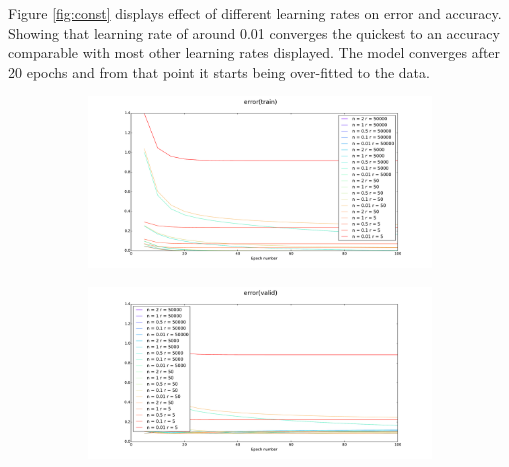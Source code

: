 \documentclass[12pt]{article}
\begin{document}
Figure \ref{fig:const} displays effect of different learning rates on error and accuracy. Showing that learning rate of around 0.01 converges the quickest to an accuracy comparable with most other learning rates displayed. The model converges after 20 epochs and from that point it starts being over-fitted to the data. 






\begin{figure}[h]
\centering
\begin{subfigure}{.5\textwidth}
  \centering
  \includegraphics[width=9.1cm]{Task1/figures/Exp_rule_error(train).pdf}
\end{subfigure}%
\begin{subfigure}{.5\textwidth}
  \centering
  \includegraphics[width=9.1cm]{Task1/figures/Exp_rule_error(valid).pdf}
\end{subfigure}%
\end{figure}
\end{document}
